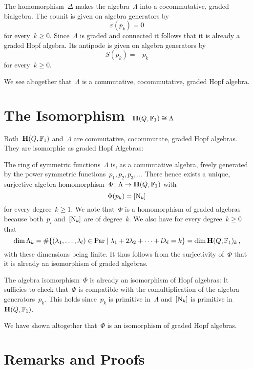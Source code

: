 \documentclass[a4paper,11pt]{scrartcl}
\begin{document}
The homomorphism~$\Delta$ makes the algebra~$\Lambda$ into a cocommutative, graded bialgebra.
The counit is given on algebra generators by
\[
  \varepsilon(p_k) = 0
\]
for every~$k \geq 0$.
Since~$\Lambda$ is graded and connected it follows that it is already a graded Hopf algebra.
Its antipode is given on algebra generators by
\[
  S(p_k) = -p_k
\]
for every~$k \geq 0$.

We see altogether that~$\Lambda$ is a commutative, cocommutative, graded Hopf algebra.





\section{The Isomorphism~$\mathbf{H}(Q, \mathbb{F}_1) \cong \Lambda$}

Both~$\mathbf{H}(Q, \mathbb{F}_1)$ and~$\Lambda$ are commutative, cocommutate, graded Hopf algebras.
They are isomorphic as graded Hopf Algebras:

The ring of symmetric functions~$\Lambda$ is, as a commutative algebra, freely generated by the power symmetric functions~$p_1, p_2, p_3, \dotsc$
There hence exists a unique, surjective algebra homomorphism~$\Phi \colon \Lambda \to \mathbf{H}(Q, \mathbb{F}_1)$ with
\[
  \Phi(p_k) = [\mathrm{N}_k]
\]
for every degree~$k \geq 1$.
We note that~$\Phi$ is a homomorphism of graded algebras because both~$p_i$ and~$[ \mathrm{N}_k ]$ are of degree~$k$.
We also have for every degree~$k \geq 0$ that
\[
  \dim \Lambda_k
  =
  \counting
  \{
    (\lambda_1, \dotsc, \lambda_l) \in \Par
  \suchthat
    \lambda_1 + 2 \lambda_2 + \dotsb + l \lambda_l = k
  \}
  =
  \dim \Hall(Q, \Finite_1)_k \,,
\]
with these dimensions being finite.
It thus follows from the surjectivity of~$\Phi$ that it is already an isomorphism of graded algebras.

The algebra isomorphism~$\Phi$ is already an isomorphism of Hopf algebras:
It sufficies to check that~$\Phi$ is compatible with the comultiplication of the algebra generators~$p_k$.
This holds since~$p_k$ is primitive in~$\Lambda$ and~$[ \mathrm{N}_k ]$ is primitive in~$\mathbf{H}(Q, \mathbb{F}_1)$.

We have shown altogether that~$\Phi$ is an isomorphism of graded Hopf algebras.






\newpage
\appendix
\section{Remarks and Proofs}
\end{document}
